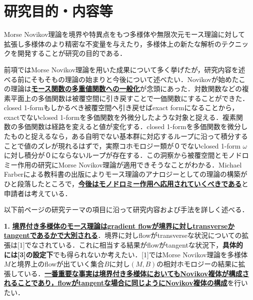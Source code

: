 \documentclass[11pt,a4j,dvipdfmx]{jarticle} 					%
\newcommand{\研究課題名}{象の卵}
\newcommand{\研究機関名}{京都大学}
\newcommand{\研究代表者氏名}{福士謙二}
\begin{document}




\section{研究目的・内容等}

\noindent
{}

Morse Novikov理論を境界や特異点をもつ多様体や無限次元モース理論に対して拡張し多様体のより精密な不変量を与えたり，多様体上の新たな解析のテクニックを開発することが研究の目的である．


\noindent
{}

前項ではMorse Novikov理論を用いた成果について多く挙げたが，研究内容を述べる前にそもそもの理論の始まりと今後について述べたい．Novikovが始めたこの理論は\textbf{\ul{モース関数の多重値関数への一般化}}が念頭にあった．対数関数などの複素平面上の多価関数は被覆空間に引き戻すことで一価関数にすることができた．closed 1-formもしかるべき被覆空間へ引き戻せばexact formになることから，exactでないclosed 1-formを多価関数を外微分したような対象と捉える．複素関数の多価関数は経路を変えると値が変化する．closed 1-formを多価関数を微分したものと捉えるなら，ある自明でない基本群に対応するループに沿って積分することで値のズレが現れるはずで，実際コホモロジー類が０でないclosed 1-form $\omega$に対し積分が０にならないループが存在する．この洞察から被覆空間とモノドロミー作用の研究にMorse Novikov理論が適用できそうなことがわかる．Michael Farberによる教科書の出版によりモース理論のアナロジーとしての理論の構築がひと段落したところで，\textbf{\ul{今後はモノドロミー作用へ応用されていくべきである}}と申請者は考えている．



\noindent
{}

以下前ページの研究テーマの項目に沿って研究内容および手法を詳しく述べる．

\vspace{1mm}
\noindent
\textbf{1. }
\textbf{\ul{境界付き多様体のモース理論はgradient flowが境界に対しtransverseかtangentであるかで大別される}}．境界に対しflowがtransverseな状況についての拡張は[1]でなされている．これに相当する結果がflowがtangentな状況下，\textbf{具体的には[3]の設定下}でも得られないか考えたい．[1]ではMorse Novikov理論を多様体$M$と境界上のflowが出ていく集合$B$に対し$(M,B)$の相対ホモロジーの結果に拡張している．\textbf{\ul{一番重要な事実は境界付き多様体においてもNovikov複体が構成されることであり，flowがtangentな場合に同じようにNovikov複体の構成}}を行いたい．
\end{document}
